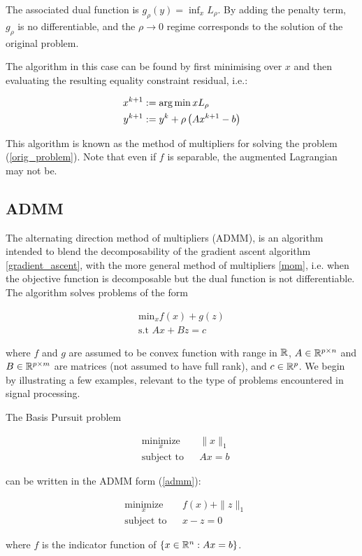 \documentclass[titlepage]{article}
\begin{document}
The associated dual function is \(g_\rho\left(y\right) = \inf_x L_\rho\). By adding the penalty term, \(g_\rho\) is no differentiable, and the \(\rho \rightarrow 0\) regime corresponds to the solution of the original problem. 

The algorithm in this case can be found by first minimising over \(x\) and then evaluating the resulting equality constraint residual, i.e.:

\begin{align}
x^{k+1} &:= \operatorname*{arg\,min}{x} L_\rho \\
y^{k+1} &:= y^{k} + \rho \left(Ax^{k+1} - b\right)
\label{mom}
\end{align}

This algorithm is known as the method of multipliers for solving the problem (\ref{orig_problem}). Note that even if \(f\) is separable, the augmented Lagrangian may not be.

\subsection{ADMM}
The alternating direction method of multipliers (ADMM), is an algorithm intended to blend the decomposability of the gradient ascent algorithm \ref{gradient_ascent}, with the more general method of multipliers \ref{mom}, i.e. when the objective function is decomposable but the dual function is not differentiable. The algorithm solves problems of the form

\begin{align}
\text{min}_{x} f\left( x \right) + g\left(z\right)
\\
\text{s.t } Ax +Bz = c
\label{admm}
\end{align}

where \(f\) and \(g\) are assumed to be convex function with range in \({\mathbb{R}}\), \(A \in {\mathbb{R}}^{p \times n}\) and \(B\in {\mathbb{R}}^{p \times m}\) are matrices (not assumed to have full rank), and \(c \in {\mathbb{R}}^p\). We begin by illustrating a few examples, relevant to the type of problems encountered in signal processing.

\begin{example}
The Basis Pursuit problem

\begin{equation*}
\begin{aligned}
& \underset{x}{\text{minimize}}
& & \|x\|_1 \\
& \text{subject to}
& & Ax = b
\label{bp}
\end{aligned}
\end{equation*}

can be written in the ADMM form (\ref{admm}):

\begin{equation*}
\begin{aligned}
& \underset{x}{\text{minimize}}
& & f\left( x \right) + \|z\|_1 \\
& \text{subject to}
& & x - z = 0
\label{bp_reform}
\end{aligned}
\end{equation*}

where \(f\) is the indicator function of \(\{x\in {\mathbb{R}}^n : Ax = b\}\). 

\end{example} 
\end{document}
